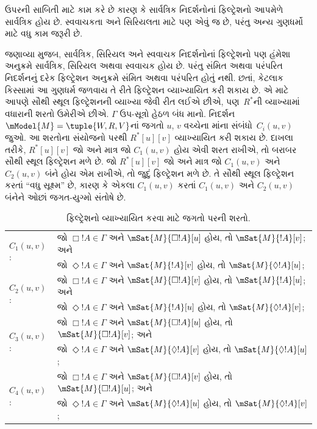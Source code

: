 ઉપરની સાબિતી  માટે કામ કરે છે કારણ કે સાર્વત્રિક
નિદર્શનોનાં ફિલ્ટ્રેશનો આપમેળે સાર્વત્રિક હોય છે. સ્વવાચકતા અને
સિરિયલતા માટે પણ એવું જ છે, પરંતુ અન્ય ગુણધર્મો માટે વધુ કામ
જરૂરી છે.
\endgroup

\begingroup
\makeatletter{}\makeatother


\label{guunit:OLP-0458}


જણાવ્યા મુજબ, સાર્વત્રિક, સિરિયલ અને સ્વવાચક નિદર્શનોનાં
ફિલ્ટ્રેશનો પણ હંમેશા અનુક્રમે સાર્વત્રિક, સિરિયલ અથવા સ્વવાચક
હોય છે. પરંતુ સંમિત અથવા પરંપરિત નિદર્શનનું દરેક ફિલ્ટ્રેશન
અનુક્રમે સંમિત અથવા પરંપરિત હોતું નથી. છતાં, કેટલાક કિસ્સામાં
આ ગુણધર્મ જળવાય તે રીતે ફિલ્ટ્રેશન વ્યાખ્યાયિત કરી શકાય છે.
એ માટે આપણે સૌથી સ્થૂલ ફિલ્ટ્રેશનની વ્યાખ્યા જેવી રીત લઈએ છીએ,
પણ~$R^*$ની વ્યાખ્યામાં વધારાની શરતો ઉમેરીએ છીએ. $\Gamma$
ઉપ-સૂત્રો હેઠળ બંધ માનો. નિદર્શન
$\mModel{M} =\tuple{W, R, V}$નાં જગતો $u$, $v$ વચ્ચેના
માંના સંબંધો~$C_i(u,v)$ જુઓ.
આ શરતોના સંયોજનો પરથી $R^*[u][v]$ વ્યાખ્યાયિત કરી શકાય છે.
દાખલા તરીકે, $R^*[u][v]$ જો અને માત્ર જો $C_1(u,v)$ હોય એવી
શરત રાખીએ, તો બરાબર સૌથી સ્થૂલ ફિલ્ટ્રેશન મળે છે. જો
$R^*[u][v]$ જો અને માત્ર જો $C_1(u,v)$ અને $C_2(u, v)$ બંને
હોય એમ રાખીએ, તો જુદું ફિલ્ટ્રેશન મળે છે. તે સૌથી સ્થૂલ
ફિલ્ટ્રેશન કરતાં ``વધુ સૂક્ષ્મ'' છે, કારણ કે એકલા $C_1(u,v)$
કરતાં $C_1(u,v)$ અને $C_2(u,v)$ બંનેને ઓછાં જગત-યુગ્મો
સંતોષે છે.

\begin{table}[ht]
  \centering
  \begin{tabular}{|ll|}
    \hline
    \multirow{2}{*}{$C_1(u,v)$:}
    &
      જો $\Box!A \in \Gamma$ અને $\mSat{M}{\Box!A}[u]$ હોય,
      તો $\mSat{M}{!A}[v]$; અને\\
    &
      જો $\Diamond!A \in \Gamma$ અને $\mSat{M}{!A}[v]$ હોય,
      તો $\mSat{M}{\Diamond!A}[u]$; \\
    \hline
    \multirow{2}{*}{$C_2(u,v)$:}
    &
      જો $\Box!A \in \Gamma$ અને $\mSat{M}{\Box!A}[v]$ હોય,
      તો $\mSat{M}{!A}[u]$; અને\\
    &
      જો $\Diamond!A \in \Gamma$ અને $\mSat{M}{!A}[u]$ હોય,
      તો $\mSat{M}{\Diamond!A}[v]$; \\
    \hline
    \multirow{2}{*}{$C_3(u,v)$:}
    &
      જો $\Box!A \in \Gamma$ અને $\mSat{M}{\Box!A}[u]$ હોય,
      તો $\mSat{M}{\Box!A}[v]$; અને\\
    &
      જો $\Diamond!A \in \Gamma$ અને $\mSat{M}{\Diamond!A}[v]$ હોય,
      તો $\mSat{M}{\Diamond!A}[u]$; \\
    \hline
    \multirow{2}{*}{$C_4(u,v)$:}
    &
      જો $\Box!A \in \Gamma$ અને $\mSat{M}{\Box!A}[v]$ હોય,
      તો $\mSat{M}{\Box!A}[u]$; અને\\
    &
      જો $\Diamond!A \in \Gamma$ અને $\mSat{M}{\Diamond!A}[u]$ હોય,
      તો $\mSat{M}{\Diamond!A}[v]$; \\
    \hline
    \end{tabular}
  \caption{ફિલ્ટ્રેશનો વ્યાખ્યાયિત કરવા માટે જગતો પરની શરતો.}
\end{table}

